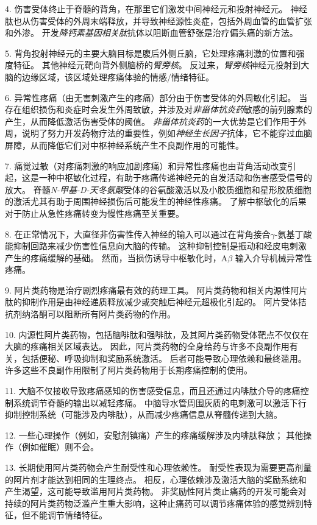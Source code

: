 4. 伤害受体终止于脊髓的背角，在那里它们激发中间神经元和投射神经元。
神经肽也从伤害受体的外周末端释放，并导致神经源性炎症，包括外周血管的血管扩张和外渗。
开发\textit{降钙素基因相关肽}抗体以阻断血管舒张是治疗偏头痛的新方法。 


5. 背角投射神经元的主要大脑目标是腹后外侧丘脑，它处理疼痛刺激的位置和强度特征。
其他神经元靶向背外侧脑桥的\textit{臂旁核}。
反过来，\textit{臂旁核}神经元投射到大脑的边缘区域，该区域处理疼痛体验的情感/情绪特征。
 

6. 异常性疼痛（由无害刺激产生的疼痛）部分由于伤害受体的外周敏化引起。
当存在组织损伤和炎症时会发生外周致敏，并涉及对\textit{非甾体抗炎药}敏感的前列腺素的产生，从而降低激活伤害受体的阈值。
\textit{非甾体抗炎药}的一大优势是它们作用于外周，说明了努力开发药物疗法的重要性，例如\textit{神经生长因子}抗体，它不能穿过血脑屏障，从而降低它们对中枢神经系统产生不良副作用的可能性。


7. 痛觉过敏（对疼痛刺激的响应加剧疼痛）和异常性疼痛也由背角活动改变引起，这是一种中枢敏化过程，有助于疼痛传递神经元的自发活动和伤害感受信号的放大。
脊髓\textit{N-甲基-D-天冬氨酸}受体的谷氨酸激活以及小胶质细胞和星形胶质细胞的激活尤其有助于周围神经损伤后可能发生的神经性疼痛。
了解中枢敏化的后果对于防止从急性疼痛转变为慢性疼痛至关重要。 


8. 在正常情况下，大直径非伤害性传入神经的输入可以通过在背角接合$\gamma$-氨基丁酸能抑制回路来减少伤害性信息向大脑的传输。
这种抑制控制是振动和经皮电刺激产生的疼痛缓解的基础。
然而，当损伤诱导中枢敏化时，A$\beta$ 输入介导机械异常性疼痛。
 

9. 阿片类药物是治疗剧烈疼痛最有效的药理工具。
阿片类药物和相关内源性阿片肽的抑制作用是由神经递质释放减少或突触后神经元超极化引起的。
阿片受体拮抗剂纳洛酮可以阻断所有阿片类药物的作用。


10. 内源性阿片类药物，包括脑啡肽和强啡肽，及其阿片类药物受体靶点不仅仅在大脑的疼痛相关区域表达。
因此，阿片类药物的全身给药与许多不良副作用有关，包括便秘、呼吸抑制和奖励系统激活。
后者可能导致心理依赖和最终滥用。
许多这些不良副作用限制了阿片类药物用于长期疼痛控制的使用。


11. 大脑不仅接收导致疼痛感知的伤害感受信息，而且还通过内啡肽介导的疼痛控制系统调节脊髓的输出以减轻疼痛。
中脑导水管周围灰质的电刺激可以激活下行抑制控制系统（可能涉及内啡肽），从而减少疼痛信息从脊髓传递到大脑。


12. 一些心理操作（例如，安慰剂镇痛）产生的疼痛缓解涉及内啡肽释放；
其他操作（例如催眠）则不会。


13. 长期使用阿片类药物会产生耐受性和心理依赖性。
耐受性表现为需要更高剂量的阿片剂才能达到相同的生理终点。
相反，心理依赖涉及激活大脑的奖励系统和产生渴望，这可能导致滥用阿片类药物。
非奖励性阿片类止痛药的开发可能会对持续的阿片类药物泛滥产生重大影响，这种止痛药可以调节疼痛体验的感觉辨别特征，但不能调节情绪特征。


